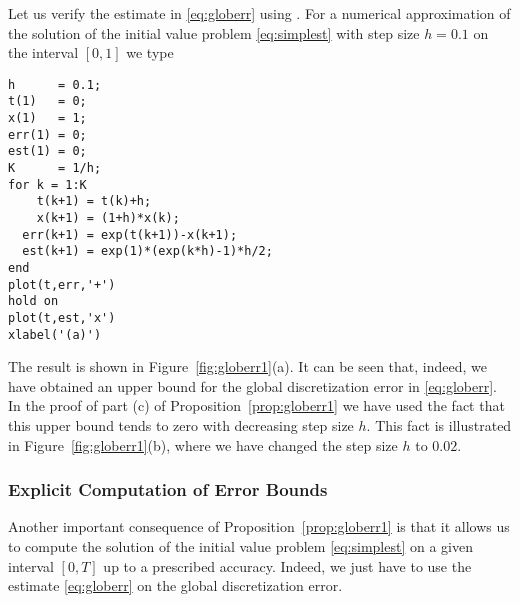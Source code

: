\documentclass{ximera}
\begin{document}
Let us verify the estimate in \eqref{eq:globerr} using \Matlabp.  For a
numerical approximation of the solution of the initial value problem 
\eqref{eq:simplest} with step size $h=0.1$ on the interval $[0,1]$
we type
\begin{verbatim}
h      = 0.1;
t(1)   = 0;
x(1)   = 1;
err(1) = 0;
est(1) = 0;
K      = 1/h;
for k = 1:K
    t(k+1) = t(k)+h;
    x(k+1) = (1+h)*x(k);
  err(k+1) = exp(t(k+1))-x(k+1);
  est(k+1) = exp(1)*(exp(k*h)-1)*h/2;
end
plot(t,err,'+')
hold on
plot(t,est,'x')
xlabel('(a)')
\end{verbatim}
The result is shown in Figure~\ref{fig:globerr1}(a).
It can be seen that, indeed, we have
obtained an upper bound for the global discretization error in
\eqref{eq:globerr}.  In the proof of part (c) of Proposition~\ref{prop:globerr1}
we have used the fact that this upper bound tends to zero with decreasing 
step size $h$.  This fact is illustrated in Figure~\ref{fig:globerr1}(b),
where we have changed the step size $h$ to $0.02$.
\begin{figure*}[htb]
   \centerline{%
   }
   \caption{Comparison of the global discretization error (marked by
   $+$) with its estimate given in \protect\eqref{eq:globerr} 
   (marked by $\times$) for the step sizes (a) $h=0.1$ and 
   (b) $h=0.02$.}
   \label{fig:globerr1}
\end{figure*}

\subsubsection*{Explicit Computation of Error Bounds}

Another important consequence of Proposition~\ref{prop:globerr1} is
that it allows us to compute the solution of the initial value
problem \eqref{eq:simplest} on a given interval $[0,T]$ up to a
prescribed accuracy.  Indeed, we just have to use the estimate
\eqref{eq:globerr} on the global discretization error.  
\end{document}
